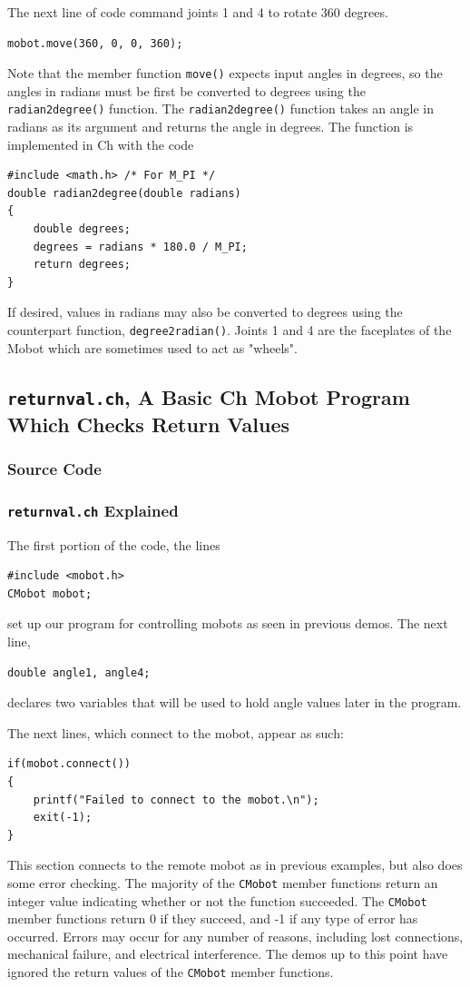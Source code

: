 \documentclass{article}
\begin{document}
The next line of code command joints 1 and 4 to rotate 360 degrees.
\begin{verbatim}
mobot.move(360, 0, 0, 360);
\end{verbatim}
Note that the member function \texttt{move()} expects input angles
in degrees, so the angles in radians must be first be converted to degrees 
using the \texttt{radian2degree()} function. The \texttt{radian2degree()} function
takes an angle in radians as its argument and returns the angle in
degrees. The function is implemented in Ch with the code
\begin{verbatim}
#include <math.h> /* For M_PI */
double radian2degree(double radians)
{
    double degrees;
    degrees = radians * 180.0 / M_PI;
    return degrees;
}
\end{verbatim}

If desired, values in radians
may also be converted to degrees using the counterpart function,
\texttt{degree2radian()}.
Joints 1 and 4 are the faceplates
of the Mobot which are sometimes used to act as "wheels".

\subsection{\texttt{returnval.ch}, A Basic Ch Mobot Program Which Checks Return Values}
\subsubsection{Source Code}


\subsubsection{\texttt{returnval.ch} Explained}
The first portion of the code, the lines
\begin{verbatim}
#include <mobot.h>
CMobot mobot;
\end{verbatim}
set up our program for controlling mobots as seen in previous demos. The next line,
\begin{verbatim}
double angle1, angle4;
\end{verbatim}
declares two variables that will be used to hold angle values later in the program.

The next
lines, which connect to the mobot, appear as such:
\begin{verbatim}
if(mobot.connect())
{
    printf("Failed to connect to the mobot.\n");
    exit(-1);
}
\end{verbatim}
This section connects to the remote mobot as in previous examples, but also
does some error checking. The majority of the \texttt{CMobot} member functions
return an integer value indicating whether or not the function succeeded.
The \texttt{CMobot} member functions return 0 if they succeed, and -1
if any type of error has occurred. Errors may occur for any number of reasons,
including lost connections, mechanical failure, and electrical interference. 
The demos up to this point have ignored the return values of the 
\texttt{CMobot} member functions.
\end{document}
